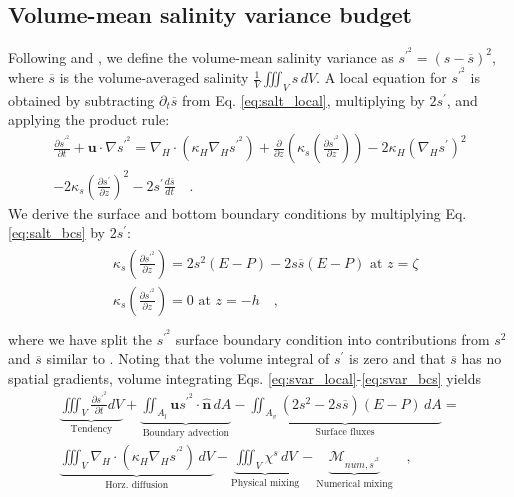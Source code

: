 \subsection{Volume-mean salinity variance budget}
Following \citet{MacCready_2018} and \citet{Lorenz_2021}, we define the volume-mean salinity variance as $s^{\prime^2} = (s-\overline{s})^2$, where $\overline{s}$ is the volume-averaged salinity $\frac{1}{V} \iiint_V s \, dV$. A local equation for $s^{\prime^2}$ is obtained by subtracting $\partial_t \overline{s}$ from Eq. \ref{eq:salt_local}, multiplying by $2s^{\prime}$, and applying the product rule:
\begin{equation} \label{eq:svar_local}
    \begin{split}
    \frac{\partial s^{\prime^2}}{\partial t} + \textbf{u} \cdot \nabla s^{\prime^2} = \nabla_H \cdot \left(\kappa_H \nabla_H s^{\prime^2} \right)+ \frac{\partial}{\partial z} \left(\kappa_s \left(\frac{\partial s^{\prime^2}}{\partial z} \right) \right) -2\kappa_H \left(\nabla_H s^\prime \right)^2\\
     -2\kappa_s \left(\frac{\partial s^\prime}{\partial z} \right)^2 - 2s^{\prime} \frac{d \overline{s}}{dt} \quad .
    \end{split}
\end{equation}
We derive the surface and bottom boundary conditions by multiplying Eq. \ref{eq:salt_bcs} by $2s^{\prime}$:
\begin{align} \label{eq:svar_bcs}
    \begin{split}
         & \kappa_s \left({\frac{\partial s^{\prime^2}}{\partial z}} \right) = 2s^2(E-P) -2s \overline{s}(E-P) \,\, \textrm{at} \,\, z = \zeta \\
         & \kappa_s \left({\frac{\partial s^{\prime^2}}{\partial z}} \right) = 0 \,\, \textrm{at} \,\, z = -h \quad ,\\
    \end{split}
\end{align}
where we have split the $s^{\prime^2}$ surface boundary condition into contributions from $s^2$ and $\overline{s}$ similar to \citet{Lorenz_2021}. 
Noting that the volume integral of $s^\prime$ is zero and that $\overline{s}$ has no spatial gradients, volume integrating Eqs. \ref{eq:svar_local}-\ref{eq:svar_bcs} yields
\begin{equation} \label{eq:svar_int}
    \begin{split}
        \underbrace{\iiint_V \frac{\partial s^{\prime^2}}{\partial t} dV}_{\text{Tendency}} + \underbrace{\iint_{A_l} \mathbf{u}s^{\prime^2} \cdot \hat{\mathbf{n}} \, dA}_{\text{Boundary advection}}  - \underbrace{\iint_{A_{v}} \left(2s^2-2s \overline{s} \right)(E-P) \, dA}_{\text{Surface fluxes}} = \\
        \underbrace{\iiint_{V} \nabla_H \cdot \left( \kappa_H \nabla_H s^{\prime^2} \right) \, dV}_{\text{Horz. diffusion}}-
        \underbrace{\iiint_V \chi^s  \, dV}_{\text{Physical mixing}} - \underbrace{\mathcal{M}_{num, s^{\prime^2}}}_\text{Numerical mixing} \quad ,
   \end{split}
\end{equation}
